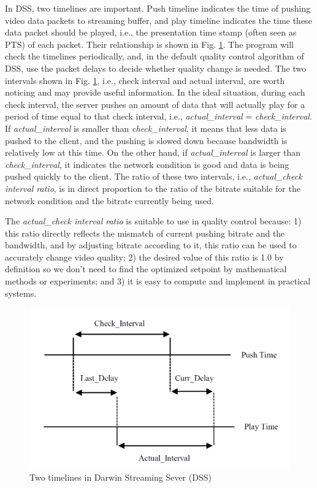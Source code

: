 \documentclass[journal]{IEEEtran}
\begin{document}
In DSS, two timelines are important. Push timeline indicates the time of pushing video data packets to streaming buffer, and play timeline indicates the time these data packet should be played, i.e., the presentation time stamp (often seen as PTS) of each packet. Their relationship is shown in Fig. \ref{fig:intervals}. The program will check the timelines periodically, and, in the default quality control algorithm of DSS, use the packet delays to decide whether quality change is needed. The two intervals shown in Fig. \ref{fig:intervals}, i.e., check interval and actual interval, are worth noticing and may provide useful information. In the ideal situation, during each check interval, the server pushes an amount of data that will actually play for a period of time equal to that check interval, i.e., \textit{actual\_interval} = \textit{check\_interval}. If \textit{actual\_interval} is smaller than \textit{check\_interval}, it means that less data is pushed to the client, and the pushing is slowed down because bandwidth is relatively low at this time. On the other hand, if \textit{actual\_interval} is larger than \textit{check\_interval}, it indicates the network condition is good and data is being pushed quickly to the client. The ratio of these two intervals, i.e., \textit{actual\_check interval ratio}, is in direct proportion to the ratio of the bitrate suitable for the network condition and the bitrate currently being used.

The \textit{actual\_check interval ratio} is suitable to use in quality control because: 1) this ratio directly reflects the mismatch of current pushing bitrate and the bandwidth, and by adjusting bitrate according to it, this ratio can be used to accurately change video quality; 2) the desired value of this ratio is 1.0 by definition so we don't need to find the optimized setpoint by mathematical methods or experiments; and 3) it is easy to compute and implement in practical systems.

\begin{figure}[t]
\centering
\includegraphics[width = 0.9\linewidth]{Intervals.png}
\caption{Two timelines in Darwin Streaming Sever (DSS) \label{fig:intervals}}
\end{figure}
\end{document}
